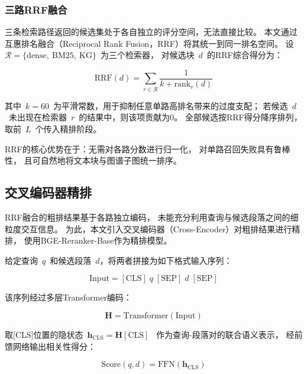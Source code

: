 \subsubsection{三路RRF融合}
\label{sec:rrf}

三条检索路径返回的候选集处于各自独立的评分空间，无法直接比较。
本文通过互惠排名融合（Reciprocal Rank Fusion，RRF）将其统一到同一排名空间。
设~$\mathcal{R} = \{\text{dense},\ \text{BM25},\ \text{KG}\}$~为三个检索器，
对候选块~$d$~的RRF综合得分为：

\begin{equation}
  \text{RRF}(d)
  = \sum_{r \in \mathcal{R}} \frac{1}{k + \text{rank}_r(d)}
  \label{eq:rrf}
\end{equation}

其中~$k = 60$~为平滑常数，用于抑制任意单路高排名带来的过度支配；
若候选~$d$~未出现在检索器~$r$~的结果中，则该项贡献为0。
全部候选按RRF得分降序排列，取前~$L$~个传入精排阶段。

RRF的核心优势在于：无需对各路分数进行归一化，
对单路召回失败具有鲁棒性，
且可自然地将文本块与图谱子图统一排序。

\subsection{交叉编码器精排}
\label{sec:rerank}

RRF融合的粗排结果基于各路独立编码，
未能充分利用查询与候选段落之间的细粒度交互信息。
为此，本文引入交叉编码器（Cross-Encoder）对粗排结果进行精排，
使用BGE-Reranker-Base作为精排模型。

给定查询~$q$~和候选段落~$d$，将两者拼接为如下格式输入序列：

\begin{equation}
  \text{Input} = [\text{CLS}]\; q\; [\text{SEP}]\; d\; [\text{SEP}]
  \label{eq:rerank-input}
\end{equation}

该序列经过多层Transformer编码：

\begin{equation}
  \mathbf{H} = \text{Transformer}(\text{Input})
  \label{eq:rerank-transformer}
\end{equation}

取[CLS]位置的隐状态~$\mathbf{h}_{\text{CLS}} = \mathbf{H}[\text{CLS}]$~
作为查询-段落对的联合语义表示，
经前馈网络输出相关性得分：

\begin{equation}
  \text{Score}(q, d) = \text{FFN}(\mathbf{h}_{\text{CLS}})
  \label{eq:rerank-score}
\end{equation}

